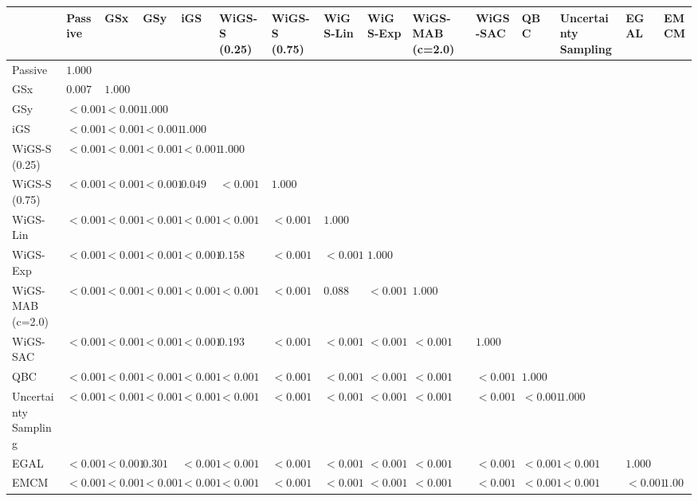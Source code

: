 \begin{tabular}{lllllllllllllll}
\toprule
 & Passive & GSx & GSy & iGS & WiGS-S (0.25) & WiGS-S (0.75) & WiGS-Lin & WiGS-Exp & WiGS-MAB (c=2.0) & WiGS-SAC & QBC & Uncertainty Sampling & EGAL & EMCM \\
\midrule
Passive & $1.000$ &  &  &  &  &  &  &  &  &  &  &  &  &  \\
GSx & $0.007$ & $1.000$ &  &  &  &  &  &  &  &  &  &  &  &  \\
GSy & $<0.001$ & $<0.001$ & $1.000$ &  &  &  &  &  &  &  &  &  &  &  \\
iGS & $<0.001$ & $<0.001$ & $<0.001$ & $1.000$ &  &  &  &  &  &  &  &  &  &  \\
WiGS-S (0.25) & $<0.001$ & $<0.001$ & $<0.001$ & $<0.001$ & $1.000$ &  &  &  &  &  &  &  &  &  \\
WiGS-S (0.75) & $<0.001$ & $<0.001$ & $<0.001$ & $0.049$ & $<0.001$ & $1.000$ &  &  &  &  &  &  &  &  \\
WiGS-Lin & $<0.001$ & $<0.001$ & $<0.001$ & $<0.001$ & $<0.001$ & $<0.001$ & $1.000$ &  &  &  &  &  &  &  \\
WiGS-Exp & $<0.001$ & $<0.001$ & $<0.001$ & $<0.001$ & $0.158$ & $<0.001$ & $<0.001$ & $1.000$ &  &  &  &  &  &  \\
WiGS-MAB (c=2.0) & $<0.001$ & $<0.001$ & $<0.001$ & $<0.001$ & $<0.001$ & $<0.001$ & $0.088$ & $<0.001$ & $1.000$ &  &  &  &  &  \\
WiGS-SAC & $<0.001$ & $<0.001$ & $<0.001$ & $<0.001$ & $0.193$ & $<0.001$ & $<0.001$ & $<0.001$ & $<0.001$ & $1.000$ &  &  &  &  \\
QBC & $<0.001$ & $<0.001$ & $<0.001$ & $<0.001$ & $<0.001$ & $<0.001$ & $<0.001$ & $<0.001$ & $<0.001$ & $<0.001$ & $1.000$ &  &  &  \\
Uncertainty Sampling & $<0.001$ & $<0.001$ & $<0.001$ & $<0.001$ & $<0.001$ & $<0.001$ & $<0.001$ & $<0.001$ & $<0.001$ & $<0.001$ & $<0.001$ & $1.000$ &  &  \\
EGAL & $<0.001$ & $<0.001$ & $0.301$ & $<0.001$ & $<0.001$ & $<0.001$ & $<0.001$ & $<0.001$ & $<0.001$ & $<0.001$ & $<0.001$ & $<0.001$ & $1.000$ &  \\
EMCM & $<0.001$ & $<0.001$ & $<0.001$ & $<0.001$ & $<0.001$ & $<0.001$ & $<0.001$ & $<0.001$ & $<0.001$ & $<0.001$ & $<0.001$ & $<0.001$ & $<0.001$ & $1.000$ \\
\bottomrule
\end{tabular}
